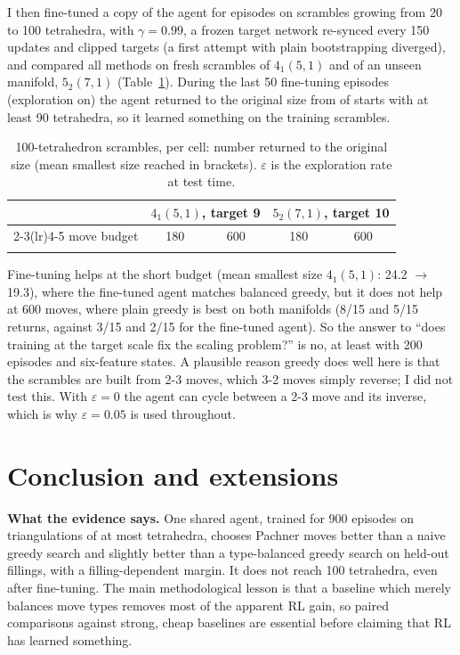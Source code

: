 \documentclass[10pt,a4paper]{article}
\newcommand{\eps}{\varepsilon}
\begin{document}
I then fine-tuned a copy of the agent for \ftEpisodes{} episodes on scrambles growing from 20 to 100 tetrahedra, with $\gamma=0.99$, a frozen target network re-synced every 150 updates and clipped targets (a first attempt with plain bootstrapping diverged), and compared all methods on fresh scrambles of $4_1(5,1)$ and of an unseen manifold, $5_2(7,1)$ (Table~\ref{tab:large}).
During the last 50 fine-tuning episodes (exploration on) the agent returned to the original size from \ftBigReached{} of \ftBigN{} starts with at least 90 tetrahedra, so it learned something on the training scrambles.

\begin{table}[!t]
\centering\small
\begin{tabular}{@{}lcccc@{}}\toprule
 & \multicolumn{2}{c}{$4_1(5,1)$, target 9} & \multicolumn{2}{c}{$5_2(7,1)$, target 10}\\
\cmidrule(lr){2-3}\cmidrule(lr){4-5}
 move budget & 180 & 600 & 180 & 600\\\midrule
\\
\bottomrule\end{tabular}
\caption{100-tetrahedron scrambles, \cN{} per cell: number returned to the original size (mean smallest size reached in brackets). $\eps$ is the exploration rate at test time.}
\label{tab:large}
\end{table}

Fine-tuning helps at the short budget (mean smallest size $4_1(5,1)$: 24.2 $\to$ 19.3), where the fine-tuned agent matches balanced greedy, but it does not help at 600 moves, where plain greedy is best on both manifolds (8/15 and 5/15 returns, against 3/15 and 2/15 for the fine-tuned agent). So the answer to ``does training at the target scale fix the scaling problem?'' is no, at least with 200 episodes and six-feature states. A plausible reason greedy does well here is that the scrambles are built from 2-3 moves, which 3-2 moves simply reverse; I did not test this.
With $\eps=0$ the agent can cycle between a 2-3 move and its inverse, which is why $\eps=0.05$ is used throughout.

\section{Conclusion and extensions}
\textbf{What the evidence says.} One shared agent, trained for 900 episodes on triangulations of at most \trMaxStart{} tetrahedra, chooses Pachner moves better than a naive greedy search and slightly better than a type-balanced greedy search on held-out fillings, with a filling-dependent margin. It does not reach 100 tetrahedra, even after fine-tuning. The main methodological lesson is that a baseline which merely balances move types removes most of the apparent RL gain, so paired comparisons against strong, cheap baselines are essential before claiming that RL has learned something.
\end{document}
